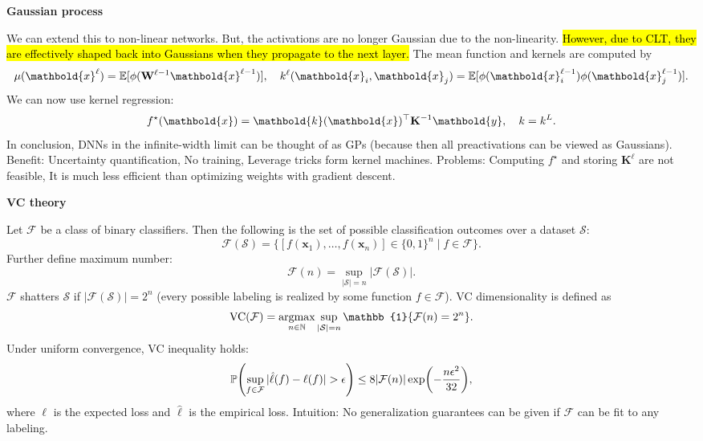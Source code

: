 \documentclass[10pt]{article}
\newenvironment{topic}[1]
{\textbf{\sffamily \footnotesize \colorbox{black}{\rlap{\textbf{\textcolor{white}{#1}}}\hspace{\linewidth}\hspace{-2\fboxsep}}}}
{}
\newenvironment{subtopic}[1]
{\begin{center}\textbf{\footnotesize \sffamily #1}\end{center}}
{}
\renewcommand{\mat}[1]{\ensuremath{\mathbf{#1}}}
\renewcommand{\vec}[1]{\ensuremath{\mathbold{#1}}}
\begin{document}
\begin{multicols*}{3}
\begin{topic}{Bayesian learning}
\begin{subtopic}{Gaussian process}
            We can extend this to non-linear networks. But, the activations are no longer Gaussian due to the
            non-linearity. \hl{However, due to CLT, they are effectively shaped back into Gaussians when they
            propagate to the next layer.} The mean function and kernels are computed by \[
                \mu(\vec{x}^{\ell}) = \E[\phi(\mat{W}^{\ell-1} \vec{x}^{\ell-1})], \quad k^{\ell}(\vec{x}_i, \vec{x}_j) = \E[\phi(\vec{x}^{\ell-1}_i) \phi(\vec{x}^{\ell-1}_j)].
            \]
            We can now use kernel regression: \[
                f^\star(\vec{x}) = \transpose{\vec{k}(\vec{x})} \mat{K}^{-1}\vec{y}, \quad k = k^L.
            \]
            In conclusion, DNNs in the infinite-width limit can be thought of as GPs (because then all
            preactivations can be viewed as Gaussians). Benefit: Uncertainty quantification, No training,
            Leverage tricks form kernel machines. Problems: Computing $f^\star$ and storing $\mat{K}^{\ell}$
            are not feasible, It is much less efficient than optimizing weights with gradient descent.

        \end{subtopic}

    \end{topic}

    \begin{topic}{Statistical learning theory}

        \begin{subtopic}{VC theory}
            Let $\mathcal{F}$ be a class of binary classifiers. Then the following is the set of possible classification outcomes over a dataset $\mathcal{S}$: \[
                \mathcal{F}(\mathcal{S}) = \{ [f(\vec{x}_1), \ldots, f(\vec{x}_n)] \in \{ 0,1 \}^n \mid f \in \mathcal{F} \}.
            \]
            Further define maximum number: \[
                \mathcal{F}(n) = \sup_{|\mathcal{S}| = n} |\mathcal{F}(\mathcal{S})|.
            \]
            $\mathcal{F}$ shatters $\mathcal{S}$ if $|\mathcal{F}(\mathcal{S})| = 2^n$ (every
            possible labeling is realized by some function $f \in \mathcal{F}$). VC dimensionality is defined as \[
                \mathrm{VC}(\mathcal{F}) = \argmax_{n \in \mathbb{N}} \sup_{|\mathcal{S}|=n} \mathbb{1}\{ \mathcal{F}(n) = 2^n \}.
            \]
            Under uniform convergence, VC inequality holds: \[
                \mathbb{P}\lft( \sup_{f \in \mathcal{F}} |\hat{\ell}(f) - \ell(f)| > \epsilon \rgt) \leq 8 |\mathcal{F}(n)| \exp \lft( -\frac{n \epsilon^2}{32} \rgt),
            \]
            where $\ell$ is the expected loss and $\hat{\ell}$ is the empirical loss. Intuition: No
            generalization guarantees can be given if $\mathcal{F}$ can be fit to any labeling.


\end{subtopic}
\end{topic}
\end{multicols*}
\end{document}
